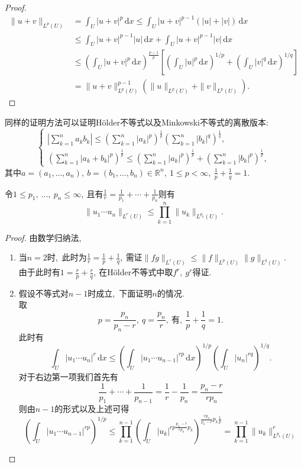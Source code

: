 \begin{proof}
	\begin{align*}
		\|u+v\|_{L^p(U)}&=\int_U|u+v|^p\,\mathrm{d}x\leqslant\int_U|u+v|^{p-1}(|u|+|v|)\,\mathrm{d}x\\
		&\leqslant\int_U|u+v|^{p-1}|u|\,\mathrm{d}x+\int_U|u+v|^{p-1}|v|\,\mathrm{d}x\\
		&\leqslant\left(\int_U|u+v|^p\,\mathrm{d}x\right)^{\frac{p-1}{p}}\left[\left(\int_U|u|^p\,\mathrm{d}x\right)^{1/p}+\left(\int_U|v|^q\,\mathrm{d}x\right)^{1/q}\right]\\
		&=\|u+v\|^{p-1}_{L^p(U)}(\|u\|_{L^p(U)}+\|v\|_{L^p(U)}).
	\end{align*}
\end{proof}
\begin{note}
	同样的证明方法可以证明H\"{o}lder不等式以及Minkowski不等式的离散版本:
$$\begin{cases}
	\left|\sum_{k=1}^na_kb_k\right|\leq\left(\sum_{k=1}^n|a_k|^p\right)^\frac1p\left(\sum_{k=1}^n|b_k|^q\right)^\frac1q,\\\left(\sum_{k=1}^n|a_k+b_k|^p\right)^\frac1p\leq\left(\sum_{k=1}^n|a_k|^p\right)^\frac1p+\left(\sum_{k=1}^n|b_k|^p\right)^\frac1p,
\end{cases}$$
其中$a=(a_1,\dots,a_n),\ b=(b_1,\dots,b_n)\in\mathbb{R}^n,\ 1\leqslant p<\infty,\ \frac{1}{p}+\frac{1}{q}=1.$
\end{note}
\begin{proposition}[H\"{o}lder不等式的一般形式]
	令$1\leqslant p_1,\ \dots,\ p_n\leqslant\infty,\ $且有$\frac{1}{r}=\frac{1}{p_1}+\cdots+\frac{1}{p_n}$则有
	$$\|u_1\cdots u_n\|_{L^r(U)}\leqslant\prod_{k=1}^{n}\|u_k\|_{L^{p_k}(U)}.$$
\end{proposition}
\begin{proof}
	由数学归纳法,\ 
	\begin{enumerate}
		\item 当$n=2$时,\ 此时为$\frac{1}{r}=\frac{1}{p}+\frac{1}{q},\ $需证$\|fg\|_{L^r(U)}\leqslant \|f\|_{L^p(U)}\|g\|_{L^q(U)}.$\\
		由于此时有$1=\frac{r}{p}+\frac{r}{q},\ $在H\"{o}lder不等式中取$f^r,\ g^r$得证.
		\item 假设不等式对$n-1$时成立,\ 下面证明$n$的情况.\\
		取
		$$p=\frac{p_n}{p_n-r},\ q=\frac{p_n}{r},\ \text{有},\ \frac{1}{p}+\frac{1}{q}=1.$$
		此时有
		$$\int_U|u_1\cdots u_n|^r\,\mathrm{d}x\leqslant\left(\int_U|u_1\cdots u_{n-1}|^{rp}\,\mathrm{d}x\right)^{1/p}\left(\int_U|u_n|^{rq}\right)^{1/q}.$$
		对于右边第一项我们首先有
		$$\frac{1}{p_1}+\cdots+\frac{1}{p_{n-1}}=\frac{1}{r}-\frac{1}{p_n}=\frac{p_n-r}{rp_n}$$
		则由$n-1$的形式以及上述可得
		$$\left(\int_U|u_1\cdots u_{n-1}|^{rp}\right)^{1/p}\leqslant\prod_{k=1}^{n-1}\left(\int_U|u_k|^{rp\frac{p_n-r}{rp_n}p_k}\right)^{\frac{rp_n}{p_n-r}p_k\frac{1}{p}}=\prod_{k=1}^{n-1}\|u_k\|^r_{L^{p_k}(U)}$$
	\end{enumerate}
\end{proof}
